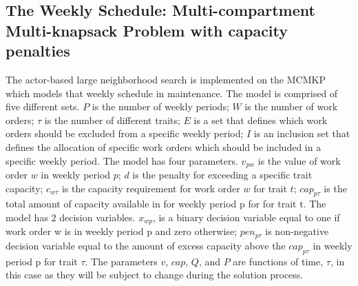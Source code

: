 \documentclass[preprint,12pt,authoryear]{elsarticle}
\begin{document}
\subsection{The Weekly Schedule: Multi-compartment Multi-knapsack Problem with capacity penalties}
\label{sub1sec2}
The actor-based large neighborhood search is implemented on the MCMKP which models that weekly schedule in maintenance. 
The model is comprised of 
five different sets. $P$ is the number of weekly periods; $W$ is the number of work orders; $\tau$ is the number of different traits; $E$ is a set that
defines which work orders should be excluded from a specific weekly period; $I$ is an inclusion set that defines the allocation of specific work orders 
which should be included in a specific weekly period. The model has four parameters. $v_{pw}$ is the value of work order $w$ in weekly period $p$; $d$ is the 
penalty for exceeding a specific trait capacity; $c_{w\tau}$ is the capacity requirement for work order $w$ for trait $t$; $cap_{p\tau}$ is the total amount 
of capacity available in for weekly period p for for trait t. The model has 2 decision variables. $x_{wp}$, is a binary decision variable equal to one 
if work order w is in weekly period p and zero otherwise; $pen_{p\tau}$ is non-negative decision variable equal to the amount of excess capacity above 
the $cap_{p\tau}$ in weekly period p for trait $\tau$. The parameters $v$, $cap$, $Q$, and $P$ are functions of time, $\tau$, in this case as they will be 
subject to change during the solution process.
\end{document}

